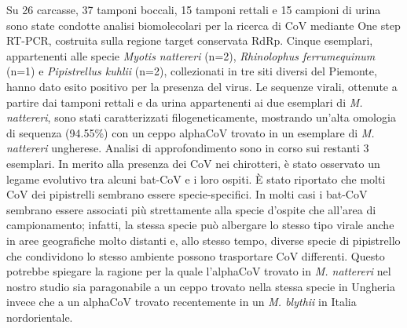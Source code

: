 {Su 26 carcasse, 37 tamponi boccali, 15 tamponi rettali e 15 campioni di urina sono state condotte analisi biomolecolari per la ricerca di CoV mediante One step RT-PCR, costruita sulla regione target conservata RdRp. Cinque esemplari, appartenenti alle specie \emph{Myotis nattereri} (n=2), \emph{Rhinolophus ferrumequinum} (n=1) e \emph{Pipistrellus kuhlii} (n=2), collezionati in tre siti diversi del Piemonte, hanno dato esito positivo per la presenza del virus. Le sequenze virali, ottenute a partire dai tamponi rettali e da urina appartenenti ai due esemplari di \emph{M. nattereri}, sono stati caratterizzati filogeneticamente, mostrando un’alta omologia di sequenza (94.55\%) con un ceppo alphaCoV trovato in un esemplare di \emph{M. nattereri} ungherese. Analisi di approfondimento sono in corso sui restanti 3 esemplari. In merito alla presenza dei CoV nei chirotteri, è stato osservato un legame evolutivo tra alcuni bat-CoV e i loro ospiti. È stato riportato che molti CoV dei pipistrelli sembrano essere specie-specifici. In molti casi i bat-CoV sembrano essere associati più strettamente alla specie d’ospite che all’area di campionamento; infatti, la stessa specie può albergare lo stesso tipo virale anche in aree geografiche molto distanti e, allo stesso tempo, diverse specie di pipistrello che condividono lo stesso ambiente possono trasportare CoV differenti. Questo potrebbe spiegare la ragione per la quale l’alphaCoV trovato in \emph{M. nattereri} nel nostro studio sia paragonabile a un ceppo trovato nella stessa specie in Ungheria invece che a un alphaCoV trovato recentemente in un \emph{M. blythii} in Italia nordorientale.
} %